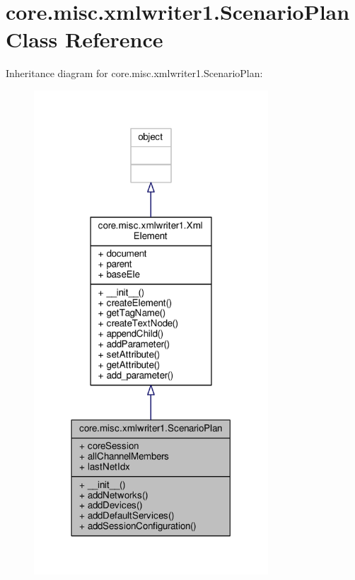 \hypertarget{classcore_1_1misc_1_1xmlwriter1_1_1_scenario_plan}{\section{core.\+misc.\+xmlwriter1.\+Scenario\+Plan Class Reference}
\label{classcore_1_1misc_1_1xmlwriter1_1_1_scenario_plan}
}


Inheritance diagram for core.\+misc.\+xmlwriter1.\+Scenario\+Plan\+:
\nopagebreak
\begin{figure}[H]
\begin{center}
\leavevmode
\includegraphics[width=248pt]{classcore_1_1misc_1_1xmlwriter1_1_1_scenario_plan__inherit__graph}
\end{center}
\end{figure}


